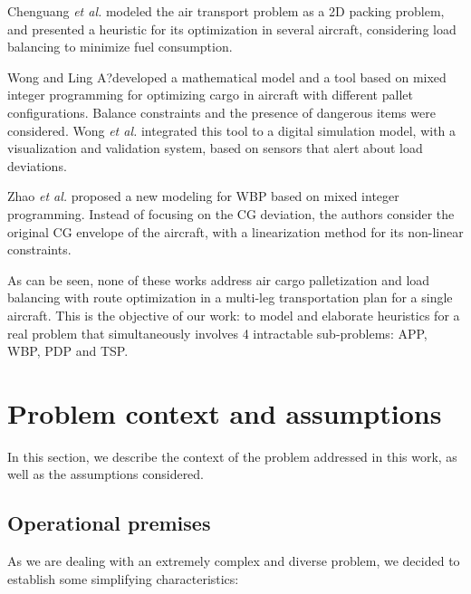 \documentclass[preprint]{elsarticle}
\begin{document}
Chenguang {\it et al.} \cite{YangLiuGao2018} modeled the air transport problem as a 2D packing problem, and presented a heuristic for its optimization in several aircraft, considering load balancing to minimize fuel consumption.

Wong and Ling \cite{wong2020}A?developed a mathematical model and a tool based on mixed integer programming for optimizing cargo in aircraft with different pallet configurations. Balance constraints and the presence of dangerous items were considered. Wong {\it et al.} \cite{eugene2021} integrated this tool to a digital simulation model, with a visualization and validation system, based on sensors that alert about load deviations.

Zhao {\it et al.} \cite{zhao2021} proposed a new modeling for WBP based on mixed integer programming. Instead of focusing on the CG deviation, the authors consider the original CG envelope of the aircraft, with a linearization method for its non-linear constraints.

As can be seen, none of these works address air cargo palletization and load balancing with route optimization in a multi-leg transportation plan for a single aircraft. This is the objective of our work: to model and elaborate heuristics for a real problem that simultaneously involves 4 intractable sub-problems: APP, WBP, PDP and TSP.


\section{Problem context and assumptions}
\label{sec3}

In this section, we describe the context of the problem addressed in this work, as well as the assumptions considered.

\subsection{Operational premises}

As we are dealing with an extremely complex and diverse problem, we decided to establish some simplifying characteristics:
\end{document}
